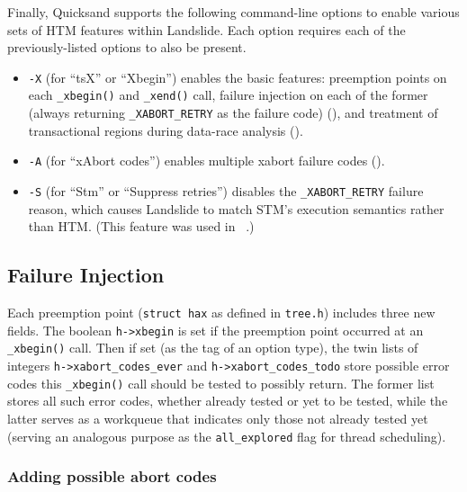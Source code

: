 Finally, Quicksand supports the following command-line options to enable various sets of HTM features within Landslide.
Each option requires each of the previously-listed options to also be present.
\begin{itemize}
	\item {\tt -X} (for ``tsX'' or ``Xbegin'') enables the basic features:
		preemption points on each {\tt \_xbegin()} and {\tt \_xend()} call,
		failure injection on each of the former
		(always returning {\tt \_XABORT\_RETRY} as the failure code)
		(\sect{\ref{sec:txn-failure}}),
		and treatment of transactional regions during data-race analysis (\sect{\ref{sec:txn-datarace}}).
	\item {\tt -A} (for ``xAbort codes'')
		enables multiple xabort failure codes (\sect{\ref{sec:txn-failure}}).
	\item {\tt -S} (for ``Stm'' or ``Suppress retries'')
		disables the {\tt \_XABORT\_RETRY} failure reason,
		which causes Landslide to match STM's execution semantics rather than HTM.
		(This feature was used in \cite{sigbovik-htm}~.)
\end{itemize}

\subsection{Failure Injection}
\label{sec:txn-failure}

Each preemption point ({\tt struct hax} as defined in {\tt tree.h})
includes three new fields.
The boolean {\tt h->xbegin} is set if the preemption point occurred at an {\tt \_xbegin()} call.
Then if set (as the tag of an option type),
the twin lists of integers
{\tt h->xabort\_codes\_ever}
and
{\tt h->xabort\_codes\_todo}
store possible error codes this {\tt \_xbegin()} call should be tested to possibly return.
The former list stores all such error codes, whether already tested or yet to be tested,
while the latter serves as a workqueue that indicates only those not already tested yet
(serving an analogous purpose as the {\tt all\_explored} flag for thread scheduling).

\subsubsection{Adding possible abort codes}
\label{sec:txn-abort-codes}

